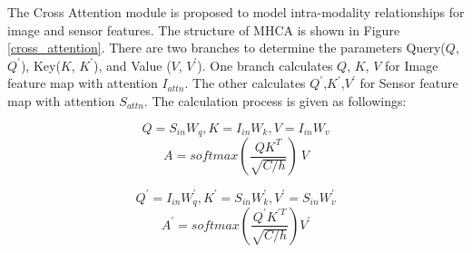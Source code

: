 \documentclass[acmsmall,manuscript, screen, review]{acmart}
\begin{document}
The Cross Attention module is proposed to model intra-modality relationships for image and sensor features. The structure of MHCA is shown in Figure \ref{cross_attention}. There are two branches to determine the parameters Query(\begin{math}
  Q
\end{math}, \begin{math}
  Q^\prime
\end{math}), Key(\begin{math}
  K
\end{math}, \begin{math}
  K^\prime
\end{math}), and Value (\begin{math}
  V
\end{math}, \begin{math}
  V^\prime
\end{math}). One branch calculates \begin{math}
  Q
\end{math}, \begin{math}
  K
\end{math}, \begin{math}
  V
\end{math} for Image feature map with attention \begin{math}
  I_{attn}
\end{math}. The other calculates \begin{math}
  Q^\prime
\end{math},\begin{math}
  K^\prime
\end{math},\begin{math}
  V^\prime
\end{math} for Sensor feature map with attention \begin{math}
  S_{attn}
\end{math}. The calculation process is given as followings:

\begin{equation}
  Q=S_{in}W_q,K=I_{in}W_k,V=I_{in}W_v
\end{equation}
\begin{equation}
  A=softmax\left(\frac{QK^T}{\sqrt{C/h}}\right)\ V
\end{equation}

\begin{equation}
  Q^\prime=I_{in}W_q^\prime,K^\prime=S_{in}W_k^\prime,V^\prime=S_{in}W_v^\prime
\end{equation}
\begin{equation}
  A^\prime=softmax\left(\frac{Q^\prime K^{\prime T}}{\sqrt{C/h}}\right)V^\prime
\end{equation}
\end{document}
